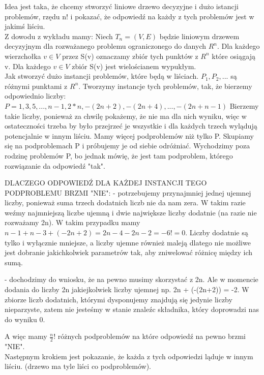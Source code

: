 \documentclass[12pt]{article}
\begin{document}
Idea jest taka, że chcemy stworzyć liniowe drzewo decyzyjne i dużo istancji problemów, rzędu n! i pokazać, że odpowiedź na każdy z tych problemów jest w jakimś liściu. \\

Z dowodu z wykładu mamy:
Niech $T_n = (V, E)$ będzie liniowym drzewem decyzyjnym dla rozważanego problemu ograniczonego do danych $R^n$. Dla każdego wierzchołka $v \in V$ przez S(v) oznaczamy zbiór tych punktów z $R^n$ które osiągają v. 
Dla każdego $v \in V$ zbiór S(v) jest wielościanem wypukłym.\\

Jak stworzyć dużo instancji problemów, które będą w liściach. 
$P_1, P_2, ...$ są różnymi punktami z $R^n$. 
Tworzymy instancje tych problemów, tak, że bierzemy odpowiednio liczby:
$P=1, 3, 5, ..., n-1, 2*n, -(2n+2), -(2n + 4), ..., -(2n + n-1)$
Bierzemy takie liczby, ponieważ za chwilę pokażemy, że nie ma dla nich wyniku, więc w ostateczności trzeba by było przejrzeć je wszystkie i dla każdych trzech wylądują potencjalnie w innym liściu.
Mamy więcej podproblemów niż tylko P. Skupiamy się na podproblemach P i próbujemy je od siebie odróżniać. Wychodzimy poza rodzinę problemów P, bo jednak mówię, że jest tam podproblem, którego rozwiązanie da odpowiedź "tak".

DLACZEGO ODPOWIEDŹ DLA KAŻDEJ INSTANCJI TEGO PODPROBLEMU BRZMI "NIE":
- potrzebujemy przynajmniej jednej ujemnej liczby, ponieważ suma trzech dodatnich liczb nie da nam zera. W takim razie weźmy najmniejszą liczbe ujemną i dwie największe liczby dodatnie (na razie nie rozważamy 2n). W takim przypadku mamy $n-1 + n-3 + (-2n+2) = 2n - 4 - 2n - 2 = -6 != 0$. Liczby dodatnie są tylko i wyłącznie mniejsze, a liczby ujemne również maleją dlatego nie możliwe jest dobranie jakichkolwiek parametrów tak, aby zniwelować różnicę między ich sumą. 

- dochodzimy do wniosku, że na pewno musimy skorzystać z 2n. Ale w momencie dodania do liczby 2n jakiejkolwiek liczby ujemnej np. 2n + (-(2n+2)) = -2. W zbiorze liczb dodatnich, którymi dysponujemy znajdują się jedynie liczby nieparzyste, zatem nie jesteśmy w stanie znaleźc składnika, który doprowadzi nas do wyniku 0. 

A więc mamy $\frac{n}{2}!$ różnych podproblemów na które odpowiedź na pewno brzmi "NIE". \\

Następnym krokiem jest pokazanie, że każda z tych odpowiedzi ląduje w innym liściu. (drzewo ma tyle liści co podproblemów). \\
\end{document}
